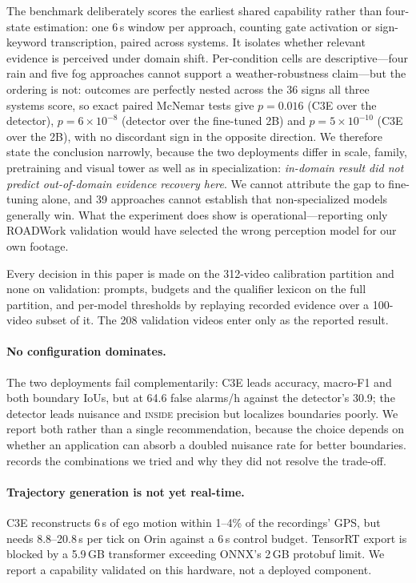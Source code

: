 \documentclass[10pt,twocolumn,letterpaper]{article}
\begin{document}
The benchmark deliberately scores the earliest shared capability rather than four-state estimation: one 6\,s window per approach, counting gate activation or sign-keyword transcription, paired across systems.  It isolates whether relevant evidence is perceived under domain shift.  Per-condition cells are descriptive---four rain and five fog approaches cannot support a weather-robustness claim---but the ordering is not: outcomes are perfectly nested across the 36 signs all three systems score, so exact paired McNemar tests give $p=0.016$ (C3E over the detector), $p=6\times10^{-8}$ (detector over the fine-tuned 2B) and $p=5\times10^{-10}$ (C3E over the 2B), with no discordant sign in the opposite direction.  We therefore state the conclusion narrowly, because the two deployments differ in scale, family, pretraining and visual tower as well as in specialization: \emph{in-domain result did not predict out-of-domain evidence recovery here}.  We cannot attribute the gap to fine-tuning alone, and 39 approaches cannot establish that non-specialized models generally win.  What the experiment does show is operational---reporting only ROADWork validation would have selected the wrong perception model for our own footage.

Every decision in this paper is made on the 312-video calibration partition and none on validation: prompts, budgets and the qualifier lexicon on the full partition, and per-model thresholds by replaying recorded evidence over a 100-video subset of it.  The 208 validation videos enter only as the reported result.

\paragraph{No configuration dominates.}  The two deployments fail complementarily: C3E leads accuracy, macro-F1 and both boundary IoUs, but at 64.6 false alarms/h against the detector's 30.9; the detector leads nuisance and \textsc{inside} precision but localizes boundaries poorly.  We report both rather than a single recommendation, because the choice depends on whether an application can absorb a doubled nuisance rate for better boundaries.   records the combinations we tried and why they did not resolve the trade-off.

\paragraph{Trajectory generation is not yet real-time.}  C3E reconstructs 6\,s of ego motion within 1--4\% of the recordings' GPS, but needs 8.8--20.8\,s per tick on Orin against a 6\,s control budget.  TensorRT export is blocked by a 5.9\,GB transformer exceeding ONNX's 2\,GB protobuf limit.  We report a capability validated on this hardware, not a deployed component.
\end{document}

